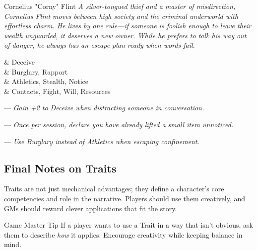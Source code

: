 \begin{WyrdNPC}[float=!t]{Cornelius "Corny" Flint}
	\emph{A silver-tongued thief and a master of misdirection, Cornelius Flint moves between high society and the criminal underworld with effortless charm. He lives by one rule—if someone is foolish enough to leave their wealth unguarded, it deserves a new owner. While he prefers to talk his way out of danger, he always has an escape plan ready when words fail.}
  
	\vspace{0.5\baselineskip}

	\begin{SkillsBox}
		\Expert & Deceive \\
		\Skilled & Burglary, Rapport \\
		\Novice & Athletics, Stealth, Notice \\
		\Untrained & Contacts, Fight, Will, Resources \\
	\end{SkillsBox}
  
	\begin{TraitsBox}
	  \item[Master of Misdirection] — \emph{Gain +2 to Deceive when distracting someone in conversation.}
	  \item[Sleight of Hand] — \emph{Once per session, declare you have already lifted a small item unnoticed.}
	  \item[Always an Escape Plan] — \emph{Use Burglary instead of Athletics when escaping confinement.}
	\end{TraitsBox}
\end{WyrdNPC}
  

 
\subsection{Final Notes on Traits}

Traits are not just mechanical advantages; they define a character’s core competencies and role in the narrative. Players should use them creatively, and GMs should reward clever applications that fit the story.

\begin{DndComment}{Game Master Tip}
 	If a player wants to use a Trait in a way that isn’t obvious, ask them to describe \emph{how} it applies. Encourage creativity while keeping balance in mind.
\end{DndComment}

